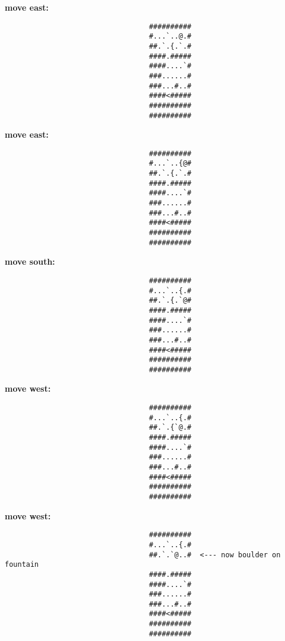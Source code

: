 \begin{MyGreenBox}
{	\textbf{move east:} \begin{verbatim}
                                  ##########
                                  #...`..@.#
                                  ##.`.{.`.#
                                  ####.#####
                                  ####....`#
                                  ###......#
                                  ###...#..#
                                  ####<#####
                                  ##########
                                  ##########
\end{verbatim}

	\textbf{move east:} \begin{verbatim}
                                  ##########
                                  #...`..{@#
                                  ##.`.{.`.#
                                  ####.#####
                                  ####....`#
                                  ###......#
                                  ###...#..#
                                  ####<#####
                                  ##########
                                  ##########
\end{verbatim}

	\textbf{move south:} \begin{verbatim}
                                  ##########
                                  #...`..{.#
                                  ##.`.{.`@#
                                  ####.#####
                                  ####....`#
                                  ###......#
                                  ###...#..#
                                  ####<#####
                                  ##########
                                  ##########
\end{verbatim}

	\textbf{move west:} \begin{verbatim}
                                  ##########
                                  #...`..{.#
                                  ##.`.{`@.#
                                  ####.#####
                                  ####....`#
                                  ###......#
                                  ###...#..#
                                  ####<#####
                                  ##########
                                  ##########
\end{verbatim}

	\textbf{move west:} \begin{verbatim}
                                  ##########
                                  #...`..{.#
                                  ##.`.`@..#  <--- now boulder on fountain
                                  ####.#####
                                  ####....`#
                                  ###......#
                                  ###...#..#
                                  ####<#####
                                  ##########
                                  ##########
\end{verbatim}

}
\end{MyGreenBox}

